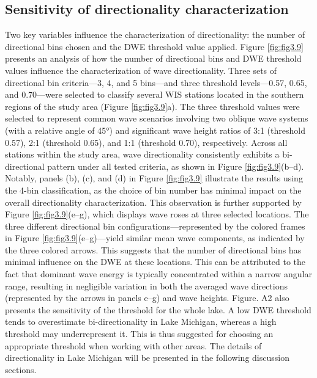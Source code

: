 \subsection{Sensitivity of directionality characterization}
\label{c3_Sensitivity of directionality characterization}
Two key variables influence the characterization of directionality: the number of directional bins chosen and the DWE threshold value applied. Figure \ref{fig:fig3.9} presents an analysis of how the number of directional bins and DWE threshold values influence the characterization of wave directionality. Three sets of directional bin criteria—3, 4, and 5 bins—and three threshold levels—0.57, 0.65, and 0.70—were selected to classify several WIS stations located in the southern regions of the study area (Figure \ref{fig:fig3.9}a). The three threshold values were selected to represent common wave scenarios involving two oblique wave systems (with a relative angle of 45°) and significant wave height ratios of 3:1 (threshold 0.57), 2:1 (threshold 0.65), and 1:1 (threshold 0.70), respectively. Across all stations within the study area, wave directionality consistently exhibits a bi-directional pattern under all tested criteria, as shown in Figure \ref{fig:fig3.9}(b–d). Notably, panels (b), (c), and (d) in Figure \ref{fig:fig3.9} illustrate the results using the 4-bin classification, as the choice of bin number has minimal impact on the overall directionality characterization. This observation is further supported by Figure \ref{fig:fig3.9}(e–g), which displays wave roses at three selected locations. The three different directional bin configurations—represented by the colored frames in Figure \ref{fig:fig3.9}(e–g)—yield similar mean wave components, as indicated by the three colored arrows. This suggests that the number of directional bins has minimal influence on the DWE at these locations. This can be attributed to the fact that dominant wave energy is typically concentrated within a narrow angular range, resulting in negligible variation in both the averaged wave directions (represented by the arrows in panels e–g) and wave heights. Figure. A2 also presents the sensitivity of the threshold for the whole lake. A low DWE threshold tends to overestimate bi-directionality in Lake Michigan, whereas a high threshold may underrepresent it. This is thus suggested for choosing an appropriate threshold when working with other areas. The details of directionality in Lake Michigan will be presented in the following discussion sections.

